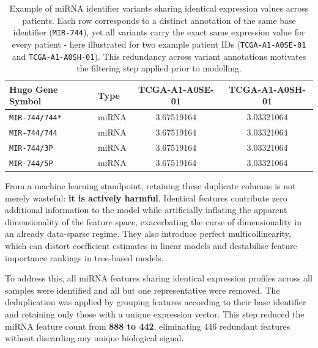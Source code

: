 \begin{table}[!ht]
        \centering
        \caption{Example of miRNA identifier variants sharing identical expression values
                across patients. Each row corresponds to a distinct annotation of the same
                base identifier (\texttt{MIR-744}), yet all variants carry the exact same
                expression value for every patient - here illustrated for two example
                patient IDs (\texttt{TCGA-A1-A0SE-01} and \texttt{TCGA-A1-A0SH-01}).
                This redundancy across variant annotations motivates the filtering step
                applied prior to modelling.}
        \label{tab:mirna-variants}
        \small
        \begin{tabular}{llcc}
        \toprule
        \textbf{Hugo Gene Symbol} & \textbf{Type} & \textbf{TCGA-A1-A0SE-01} & \textbf{TCGA-A1-A0SH-01} \\
        \midrule
        \texttt{MIR-744/744*} & miRNA & 3.67519164 & 3.03321064 \\
        \texttt{MIR-744/744}  & miRNA & 3.67519164 & 3.03321064 \\
        \texttt{MIR-744/3P}   & miRNA & 3.67519164 & 3.03321064 \\
        \texttt{MIR-744/5P}   & miRNA & 3.67519164 & 3.03321064 \\
        \bottomrule
    \end{tabular}
\end{table}

From a machine learning standpoint, retaining these duplicate columns is not
merely wasteful: \textbf{it is actively harmful}. Identical features contribute zero
additional information to the model while artificially inflating the apparent
dimensionality of the feature space, exacerbating the curse of dimensionality
in an already data-sparse regime. They also introduce perfect multicollinearity,
which can distort coefficient estimates in linear models and destabilise
feature importance rankings in tree-based models.

To address this, all miRNA features sharing identical expression profiles
across all samples were identified and all but one representative were removed.
The deduplication was applied by grouping features according to their base
identifier and retaining only those with a unique expression vector. This step
reduced the miRNA feature count from \textbf{888 to 442}, eliminating 446
redundant features without discarding any unique biological signal.

